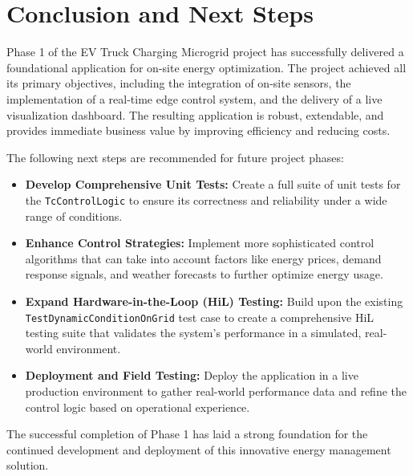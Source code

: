 \documentclass{article}
\begin{document}
\section{Conclusion and Next Steps}
Phase 1 of the EV Truck Charging Microgrid project has successfully delivered a foundational application for on-site energy optimization. The project achieved all its primary objectives, including the integration of on-site sensors, the implementation of a real-time edge control system, and the delivery of a live visualization dashboard. The resulting application is robust, extendable, and provides immediate business value by improving efficiency and reducing costs.

The following next steps are recommended for future project phases:
\begin{itemize}
    \item \textbf{Develop Comprehensive Unit Tests:} Create a full suite of unit tests for the \texttt{TcControlLogic} to ensure its correctness and reliability under a wide range of conditions.
    \item \textbf{Enhance Control Strategies:} Implement more sophisticated control algorithms that can take into account factors like energy prices, demand response signals, and weather forecasts to further optimize energy usage.
    \item \textbf{Expand Hardware-in-the-Loop (HiL) Testing:} Build upon the existing \texttt{TestDynamicConditionOnGrid} test case to create a comprehensive HiL testing suite that validates the system's performance in a simulated, real-world environment.
    \item \textbf{Deployment and Field Testing:} Deploy the application in a live production environment to gather real-world performance data and refine the control logic based on operational experience.
\end{itemize}

The successful completion of Phase 1 has laid a strong foundation for the continued development and deployment of this innovative energy management solution.
\end{document}
